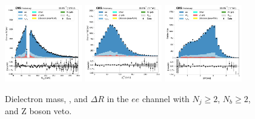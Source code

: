 \begin{figure}[htb!]
    \centering
    \includegraphics[width=0.3\textwidth]{chapters/Appendix/sectionPlots/figures/data_mc_overlays/ee_2016_cat_gt2_gt2_b_signal_linear_lepton_dilepton1_mass}
    \includegraphics[width=0.3\textwidth]{chapters/Appendix/sectionPlots/figures/data_mc_overlays/ee_2016_cat_gt2_gt2_b_signal_linear_lepton_dilepton1_pt}
    \includegraphics[width=0.3\textwidth]{chapters/Appendix/sectionPlots/figures/data_mc_overlays/ee_2016_cat_gt2_gt2_b_signal_linear_lepton_dilepton1_delta_r}
    \caption{Dielectron mass, \pt, and $\Delta R$ in the $ee$ channel
    with $N_{j} \geq 2$, $N_{b} \geq 2$, and Z boson veto.}
    \label{fig:ee_2_dilepton}
\end{figure}

